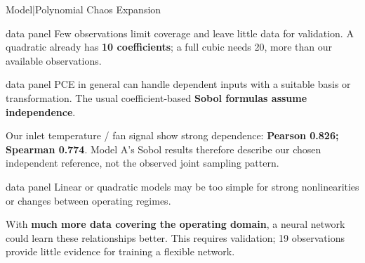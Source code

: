 \begin{frame}{Model\enspace|\enspace Polynomial Chaos Expansion}
  \begin{beamercolorbox}[sep=2mm,wd=\textwidth]{data panel}
    \footnotesize
    Few observations limit coverage and leave little data for validation.
    A quadratic already has \textbf{10 coefficients}; a full cubic needs 20,
    more than our available observations.
  \end{beamercolorbox}
  \medskip
  \begin{beamercolorbox}[sep=2mm,wd=\textwidth]{data panel}
    \footnotesize
    PCE in general can handle dependent inputs with a suitable basis or transformation.
    The usual coefficient-based \textbf{Sobol formulas assume independence}.\par
    \smallskip
    Our inlet temperature / fan signal show strong dependence:
    \textbf{Pearson 0.826; Spearman 0.774}. Model A's Sobol results therefore describe
    our chosen independent reference, not the observed joint sampling pattern.
  \end{beamercolorbox}
  \medskip
  \begin{beamercolorbox}[sep=2mm,wd=\textwidth]{data panel}
    \footnotesize
    Linear or quadratic models may be too simple for strong nonlinearities or
    changes between operating regimes.\par
    \smallskip
    With \textbf{much more data covering the operating domain}, a neural network
    could learn these relationships better. This requires validation; 19 observations
    provide little evidence for training a flexible network.
  \end{beamercolorbox}
\end{frame}

